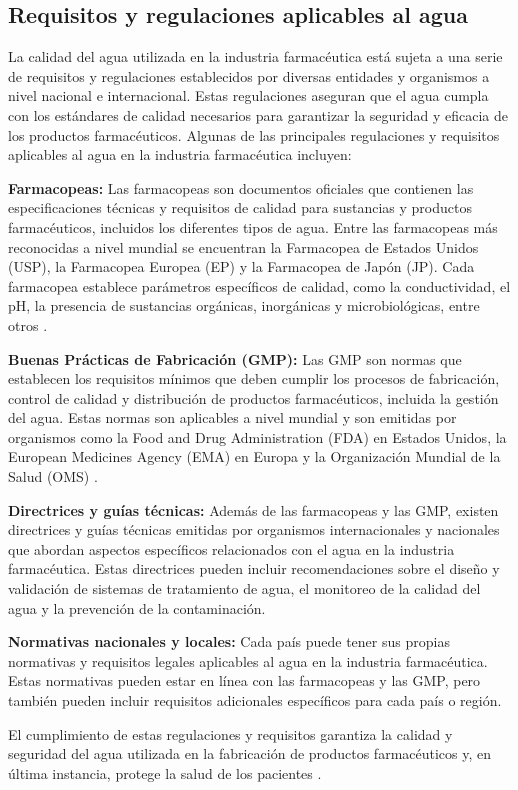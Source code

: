 \subsection{ Requisitos y regulaciones aplicables al agua}

La calidad del agua utilizada en la industria farmacéutica está sujeta a una serie de requisitos y regulaciones establecidos por diversas entidades y organismos a nivel nacional e internacional. Estas regulaciones aseguran que el agua cumpla con los estándares de calidad necesarios para garantizar la seguridad y eficacia de los productos farmacéuticos. Algunas de las principales regulaciones y requisitos aplicables al agua en la industria farmacéutica incluyen:

\textbf{Farmacopeas:} Las farmacopeas son documentos oficiales que contienen las especificaciones técnicas y
requisitos de calidad para sustancias y productos farmacéuticos, incluidos los diferentes
tipos de agua. Entre las farmacopeas más reconocidas a nivel mundial se encuentran la
Farmacopea de Estados Unidos (USP), la Farmacopea Europea (EP) y la Farmacopea de Japón
(JP). Cada farmacopea establece parámetros específicos de calidad, como la conductividad,
el pH, la presencia de sustancias orgánicas, inorgánicas y microbiológicas, entre otros \cite{farm.veronicamartinezFARMACOPEAS2005}.

\textbf{ Buenas Prácticas de Fabricación (GMP):} Las GMP son normas que establecen los requisitos mínimos que deben cumplir
los procesos de fabricación, control de calidad y distribución de productos farmacéuticos, incluida la gestión del agua.
Estas normas son aplicables a nivel mundial y son emitidas por organismos como la Food and Drug Administration (FDA) en
Estados Unidos, la European Medicines Agency (EMA) en Europa y la Organización Mundial de la Salud (OMS) \cite{ispeGoodManufacturingPractice}.

\textbf{ Directrices y guías técnicas:} Además de las farmacopeas y las GMP, existen directrices y guías técnicas
emitidas por organismos internacionales y nacionales que abordan aspectos específicos relacionados con el agua en
la industria farmacéutica. Estas directrices pueden incluir recomendaciones sobre el diseño y validación de sistemas
de tratamiento de agua, el monitoreo de la calidad del agua y la prevención de la contaminación.

\textbf{ Normativas nacionales y locales:} Cada país puede tener sus propias normativas y requisitos legales
aplicables al agua en la industria farmacéutica. Estas normativas pueden estar en línea con las farmacopeas y
las GMP, pero también pueden incluir requisitos adicionales específicos para cada país o región.


El cumplimiento de estas regulaciones y requisitos garantiza la calidad y seguridad del agua utilizada en la fabricación de productos farmacéuticos y, en última instancia, protege la salud de los pacientes \cite{juanantoniodelacuerdaImportanciaAguaIndustria2021}.
